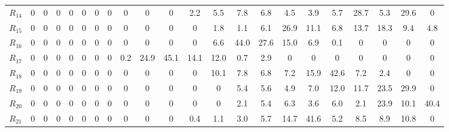 \begin{table}[h!]
\begin{tabularx}{\textwidth}{X|CCCCCCCCCCCCCCCCCCCCC}
$R_{14}$ & 0 & 0 & 0 & 0 & 0 & 0 & 0 & 0 & 0 & 0 & 2.2 & 5.5 & 7.8 & 6.8 & 4.5 & 3.9 & 5.7 & 28.7 & 5.3 & 29.6 & 0 \\
$R_{15}$ & 0 & 0 & 0 & 0 & 0 & 0 & 0 & 0 & 0 & 0 & 0 & 1.8 & 1.1 & 6.1 & 26.9 & 11.1 & 6.8 & 13.7 & 18.3 & 9.4 & 4.8 \\
$R_{16}$ & 0 & 0 & 0 & 0 & 0 & 0 & 0 & 0 & 0 & 0 & 0 & 6.6 & 44.0 & 27.6 & 15.0 & 6.9 & 0.1 & 0 & 0 & 0 & 0 \\
$R_{17}$ & 0 & 0 & 0 & 0 & 0 & 0 & 0 & 0.2 & 24.9 & 45.1 & 14.1 & 12.0 & 0.7 & 2.9 & 0 & 0 & 0 & 0 & 0 & 0 & 0 \\
$R_{18}$ & 0 & 0 & 0 & 0 & 0 & 0 & 0 & 0 & 0 & 0 & 0 & 10.1 & 7.8 & 6.8 & 7.2 & 15.9 & 42.6 & 7.2 & 2.4 & 0 & 0 \\
$R_{19}$ & 0 & 0 & 0 & 0 & 0 & 0 & 0 & 0 & 0 & 0 & 0 & 0 & 5.4 & 5.6 & 4.9 & 7.0 & 12.0 & 11.7 & 23.5 & 29.9 & 0 \\
$R_{20}$ & 0 & 0 & 0 & 0 & 0 & 0 & 0 & 0 & 0 & 0 & 0 & 0 & 2.1 & 5.4 & 6.3 & 3.6 & 6.0 & 2.1 & 23.9 & 10.1 & 40.4 \\
$R_{21}$ & 0 & 0 & 0 & 0 & 0 & 0 & 0 & 0 & 0 & 0 & 0.4 & 1.1 & 3.0 & 5.7 & 14.7 & 41.6 & 5.2 & 8.5 & 8.9 & 10.8 & 0 \\
\bottomrule
\end{tabularx}
\end{table}
